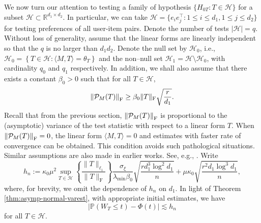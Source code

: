 \documentclass[12pt]{article}
\newcommand{\tF}{{\rm F}}
\newcommand{\abs}[1]{\left\lvert#1\right\rvert}
\newcommand{\norm}[1]{\left\lVert#1\right\rVert}
\newcommand{\R}{\mathbb{R}}
\newcommand{\cH}{\mathcal{H}}
\newcommand{\cP}{\mathcal{P}}
\theoremstyle{plain}
\begin{document}
\begin{sloppypar}
We now turn our attention to testing a family of hypothesis $\{H_{0T}: T\in \cH\}$ for a subset $\cH\subset \R^{d_1\times d_2}$. In particular, we can take $\cH=\{e_i e_j^\top: 1\le i\le d_1, 1\le j\le d_2\}$ for testing preferences of all user-item pairs. Denote the number of tests $\abs{\cH}=q$. Without loss of generality, assume that the linear forms are linearly independent so that the $q$ is no larger than $d_1 d_2$.  Denote the null set by $\cH_0$, i.e., $\cH_0=\left\{T\in \cH: \langle M,T\rangle=\theta_T \right\}$ and the non–null set $\cH_1=\cH\setminus \cH_0$, with cardinality $q_0$ and $q_1$ respectively. In addition, we shall also assume that there exists a constant $\beta_0>0$ such that for all $T\in \cH$,
\begin{equation}\label{eq:alignment}
	\norm{\cP_M(T)}_\tF\ge\beta_0 \|T\|_{\rm F}\sqrt{r\over d_1}.
\end{equation}
Recall that from the previous section, $\norm{\cP_M(T)}_\tF$ is proportional to the (asymptotic) variance of the test statistic with respect to a linear form $T$. When $\norm{\cP_M(T)}_\tF=0$, the linear form $\langle M, T\rangle=0$ and estimates with faster rate of convergence can be obtained. This condition avoids such pathological situations. Similar assumptions are also made in earlier works. See, e.g., \cite{xia2021statistical}. Write
\begin{equation}\label{eq:fixed-asymp}
h_n:=\kappa_0 \mu^2   \sup_{T\in \cH}\left\{\frac{ \|T\|_{\ell_1} }{ \|T\|_{\mathrm{F}} }\right\} \frac{\sigma_{\xi}  }{\lambda_{\min} \beta_0 } \sqrt{\frac{ r d_1^3 \log ^2 d_1}{n}} + \mu \kappa_0 \sqrt{\frac{r^2 d_1 \log ^3 d_1}{n}},
\end{equation}
where, for brevity, we omit the dependence of $h_n$ on $d_1$. In light of Theorem \ref{thm:asymp-normal-varest}, with appropriate initial estimates, we have
$$
\left|\mathbb{P}\left(W_{T} \leq t\right)-\Phi\left(t\right)\right|\lesssim h_n
$$
for all $T\in \cH$.


\end{sloppypar}
\end{document}
